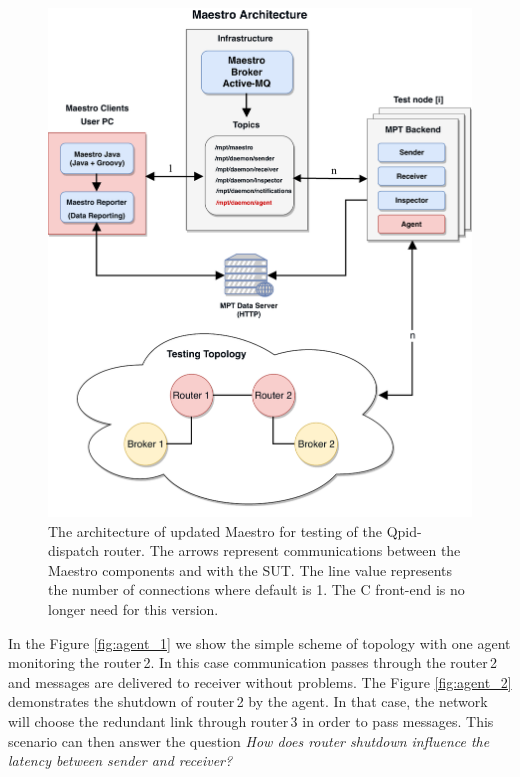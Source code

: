 \begin{figure}[h]
  \centering
  \includegraphics[width=15cm]{obrazky-figures/msg_perf_tool_for_router.pdf}
  \caption{The architecture of updated Maestro for testing of the Qpid-dispatch router. The arrows represent communications between the Maestro components and with the SUT. The line value represents the number of connections where default is 1. The C front-end is no longer need for this version.}
  \label{fig:msg_perf_tool_update}
\end{figure}

In the Figure \ref{fig:agent_1} we show the simple scheme of topology with one agent monitoring the router\,2. In this case communication passes through the router\,2 and messages are delivered to receiver without problems. The Figure \ref{fig:agent_2} demonstrates the shutdown of router\,2  by the agent. In that case, the network will choose the redundant link through router\,3 in order to pass messages. This scenario can then answer the question \emph{How does router shutdown influence the latency between sender and receiver?}

